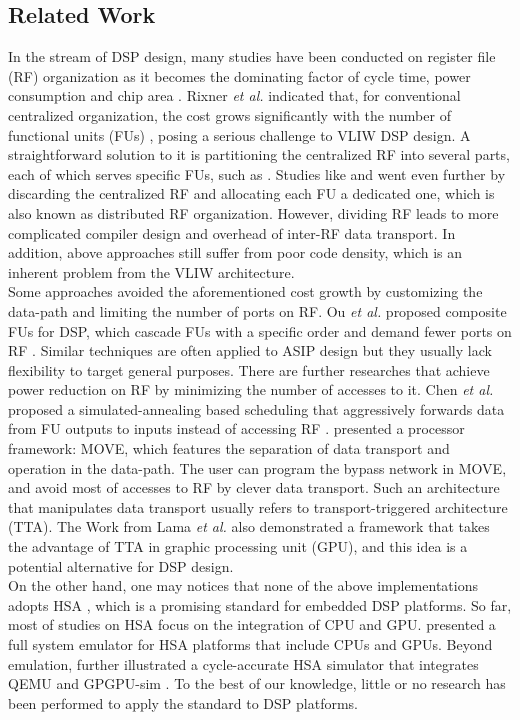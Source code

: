\documentclass[12pt]{article}
\begin{document}
\begin{CJK}{UTF8}{bkai}
\section{Related Work}
    In the stream of DSP design, many studies have been conducted on register file (RF) organization as it becomes the dominating factor of cycle time, power consumption and chip area \cite{register}.
    Rixner \textit{et al.} indicated that, for conventional centralized organization, the cost grows significantly with the number of functional units (FUs) \cite{register}, posing a serious challenge to VLIW DSP design.
    A straightforward solution to it is partitioning the centralized RF into several parts, each of which serves specific FUs, such as \cite{cluster}.
    Studies like \cite{synzen} and \cite{dsplite} went even further by discarding the centralized RF and allocating each FU a dedicated one, which is also known as distributed RF organization.
    However, dividing RF leads to more complicated compiler design and overhead of inter-RF data transport.
    In addition, above approaches still suffer from poor code density, which is an inherent problem from the VLIW architecture.
    \\\indent
    Some approaches avoided the aforementioned cost growth by customizing the data-path and limiting the number of ports on RF.
    Ou \textit{et al.} proposed composite FUs for DSP, which cascade FUs with a specific order and demand fewer ports on RF \cite{cascade} \cite{hearaid}.
    Similar techniques are often applied to ASIP design but they usually lack flexibility to target general purposes.
    There are further researches that achieve power reduction on RF by minimizing the number of accesses to it.
    Chen \textit{et al.} proposed a simulated-annealing based scheduling that aggressively forwards data from FU outputs to inputs instead of accessing RF \cite{multistage}.
    \cite{move} presented a processor framework: MOVE, which features the separation of data transport and operation in the data-path. 
    The user can program the bypass network in MOVE, and avoid most of accesses to RF by clever data transport.
    Such an architecture that manipulates data transport usually refers to transport-triggered architecture (TTA).
    The Work from Lama \textit{et al.} \cite{ttagpu} also demonstrated a framework that takes the advantage of TTA in graphic processing unit (GPU), and this idea is a potential alternative for DSP design.
    \\\indent
    On the other hand, one may notices that none of the above implementations adopts HSA \cite{systemspec}, which is a promising standard for embedded DSP platforms.
    So far, most of studies on HSA focus on the integration of CPU and GPU. \cite{hsaemu} presented a full system emulator for HSA platforms that include CPUs and GPUs.
    Beyond emulation, \cite{hsacyc} further illustrated a cycle-accurate HSA simulator that integrates QEMU \cite{qemu} and GPGPU-sim \cite{gpgpusim}.
    To the best of our knowledge, little or no research has been performed to apply the standard to DSP platforms.


\end{CJK}
\end{document}
